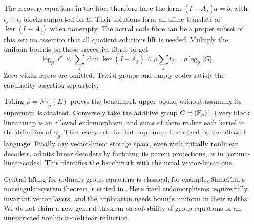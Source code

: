 \begin{informalproof}
The recovery equations in the fibre therefore have the form
$(I-A_j)a=b$, with $t_j\times t_j$ blocks supported on $E$.
Their solutions form an affine translate of $\ker(I-A_j)$ when
nonempty. The actual code fibre can be a proper subset of this set;
no assertion that all quotient solutions lift is needed.
Multiply the uniform bounds on these successive fibres to get
\[
 \log_p|\mathcal C|\le\sum_j\dim\ker(I-A_j)
                      \le\rho\sum_jt_j=\rho\log_p|G|.
\]
Zero-width layers are omitted. Trivial groups and empty codes satisfy
the cardinality assertion separately.

Taking $\rho=N\gamma_p(E)$ proves the benchmark upper bound without
assuming its supremum is attained. Conversely take the additive group
$G=(\mathbb{F}_p)^t$. Every block linear map is an allowed endomorphism,
and sums of them realize each kernel in the definition of $\gamma_p$.
Thus every rate in that supremum is realized by the allowed language.
Finally any vector-linear storage space, even with initially nonlinear
decoders, admits linear decoders by factoring its parent projections,
as in \cref{cor:mc-linear-codes}. This identifies the benchmark with
the usual vector-linear one.
\end{informalproof}

Central lifting for ordinary group equations is classical; for example,
Shmel'kin's nonsingular-system theorem is stated in
\cite[Introduction]{Mikheenko}. Here fixed endomorphisms require
fully invariant vector layers, and the application needs bounds uniform
in their widths. We do not claim a new general theorem on solvability
of group equations or an unrestricted nonlinear-to-linear reduction.


